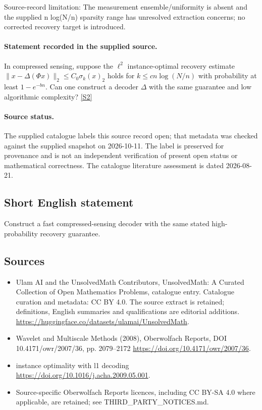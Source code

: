 \documentclass[11pt]{article}
\begin{document}
Source-record limitation: The measurement ensemble/uniformity is absent and the supplied n log(N/n) sparsity range has unresolved extraction concerns; no corrected recovery target is introduced.
\paragraph{Statement recorded in the supplied source.}
In compressed sensing, suppose the $\ell^2$ instance-optimal recovery estimate $\lVert x-\Delta(\Phi x)\rVert_2\leq C_0\sigma_k(x)_2$ holds for $k\leq cn\log(N/n)$ with probability at least $1-e^{-bn}$. Can one construct a decoder $\Delta$ with the same guarantee and low algorithmic complexity? \href{https://doi.org/10.4171/owr/2007/36}{[S2]}
\paragraph{Source status.}
The supplied catalogue labels this source record open; that metadata was checked against the supplied snapshot on 2026-10-11. The label is preserved for provenance and is not an independent verification of present open status or mathematical correctness. The catalogue literature assessment is dated 2026-08-21.
\subsection{Short English statement}
Construct a fast compressed-sensing decoder with the same stated high-probability recovery guarantee.
\subsection{Sources}
\begin{itemize}
\item[S1] Ulam AI and the UnsolvedMath Contributors, UnsolvedMath: A Curated Collection of Open Mathematics Problems, catalogue entry. Catalogue curation and metadata: CC BY 4.0. The source extract is retained; definitions, English summaries and qualifications are editorial additions.
\url{https://huggingface.co/datasets/ulamai/UnsolvedMath}.
\item[S2] Wavelet and Multiscale Methods (2008), Oberwolfach Reports, DOI 10.4171/owr/2007/36, pp. 2079--2172
\url{https://doi.org/10.4171/owr/2007/36}.
\item[S3] instance optimality with l1 decoding
\url{https://doi.org/10.1016/j.acha.2009.05.001}.
\item Source-specific Oberwolfach Reports licences, including CC BY-SA 4.0 where applicable, are retained; see THIRD\_PARTY\_NOTICES.md.
\end{itemize}
\end{document}
